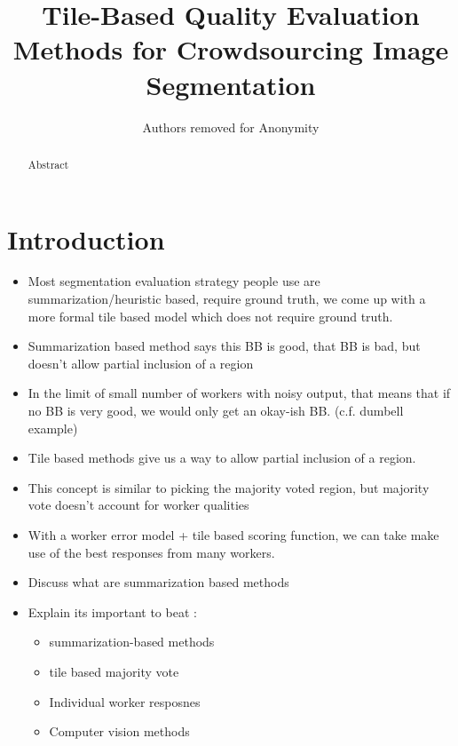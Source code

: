 \documentclass[letterpaper]{article} %
\begin{document}
 

%
\title{Tile-Based Quality Evaluation Methods for Crowdsourcing Image Segmentation}
\author{Authors removed for Anonymity}
\maketitle
\begin{abstract}
Abstract
\end{abstract}

\section{Introduction}
\begin{itemize}
\item Most segmentation evaluation strategy people use are summarization/heuristic based, require ground truth, we come up with a more formal tile based model which does not require ground truth.
\item Summarization based method says this BB is good, that BB is bad, but doesn’t allow partial inclusion of a region
\item In the limit of small number of workers with noisy output, that means that if no BB is very good, we would only get an okay-ish BB. (c.f. dumbell example)
\item Tile based methods give us a way to allow partial inclusion of a region. 
\item This concept is similar to picking the majority voted region, but majority vote doesn’t account for worker qualities
\item With a worker error model + tile based scoring function, we can take make use of the best responses from many workers.
\item Discuss what are summarization based methods 
\item Explain its important to beat : 
\begin{itemize}
\item summarization-based methods
\item tile based majority vote 
\item Individual worker resposnes
\item Computer vision methods 
\end{itemize}
\end{itemize}
\end{document}
